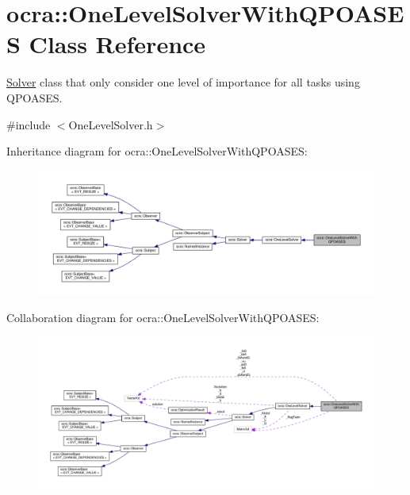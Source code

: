\hypertarget{classocra_1_1OneLevelSolverWithQPOASES}{}\section{ocra\+:\+:One\+Level\+Solver\+With\+Q\+P\+O\+A\+S\+ES Class Reference}
\label{classocra_1_1OneLevelSolverWithQPOASES}


\hyperlink{classocra_1_1Solver}{Solver} class that only consider one level of importance for all tasks using Q\+P\+O\+A\+S\+ES.  




{\ttfamily \#include $<$One\+Level\+Solver.\+h$>$}



Inheritance diagram for ocra\+:\+:One\+Level\+Solver\+With\+Q\+P\+O\+A\+S\+ES\+:
\nopagebreak
\begin{figure}[H]
\begin{center}
\leavevmode
\includegraphics[width=350pt]{d1/dbe/classocra_1_1OneLevelSolverWithQPOASES__inherit__graph}
\end{center}
\end{figure}


Collaboration diagram for ocra\+:\+:One\+Level\+Solver\+With\+Q\+P\+O\+A\+S\+ES\+:
\nopagebreak
\begin{figure}[H]
\begin{center}
\leavevmode
\includegraphics[width=350pt]{db/d99/classocra_1_1OneLevelSolverWithQPOASES__coll__graph}
\end{center}
\end{figure}
